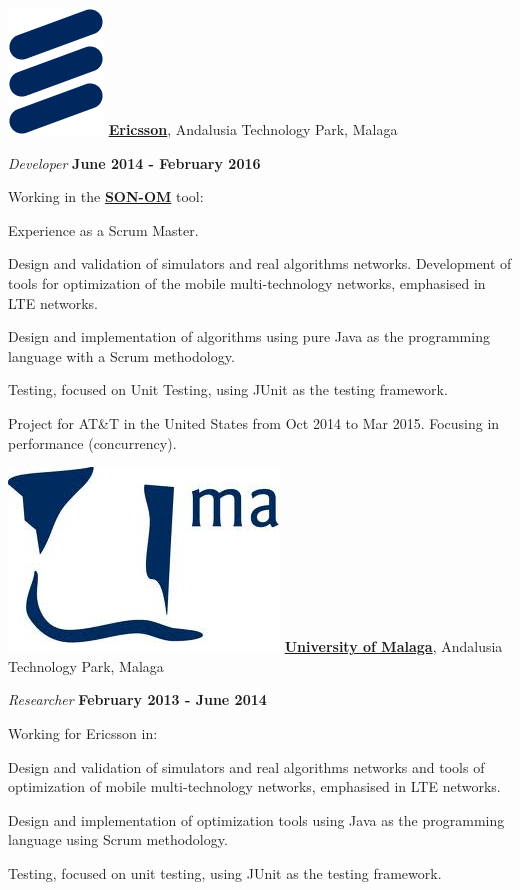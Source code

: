 \includegraphics[scale=0.3]{companies/ericsson2.png} \href{https://www.ericsson.com/}{\textbf{Ericsson}},
Andalusia Technology Park, Malaga
\begin{outerlist}
\item[] \textit{Developer}%
        \hfill \textbf{June 2014 - February 2016}

Working in the \href{http://www.ericsson.com/ourportfolio/products/son-optimization-manager}{\textbf{SON-OM}} tool:
\begin{innerlist}
\item Experience as a Scrum Master.
\item Design and validation of simulators and real algorithms networks.
Development of tools for optimization of the mobile multi-technology networks, emphasised in LTE networks.
\item Design and implementation of algorithms using pure Java as the programming language with a Scrum methodology.
\item Testing, focused on Unit Testing, using JUnit as the testing framework.
\item Project for AT\&T in the United States from Oct 2014 to Mar 2015.
Focusing in performance (concurrency).
\end{innerlist}
\end{outerlist}

\includegraphics[scale=0.2]{companies/uma} \href{https://www.uma.es/}{\textbf{University of Malaga}},
Andalusia Technology Park, Malaga
\begin{outerlist}
\item[] \textit{Researcher}%
        \hfill \textbf{February 2013 - June 2014}

Working for Ericsson in:
\begin{innerlist}
\item Design and validation of simulators and real algorithms networks and tools of optimization of mobile multi-technology networks, emphasised in LTE networks.
\item Design and implementation of optimization tools using Java as the programming language using Scrum methodology.
\item Testing, focused on unit testing, using JUnit as the testing framework.
\end{innerlist}
\end{outerlist}

